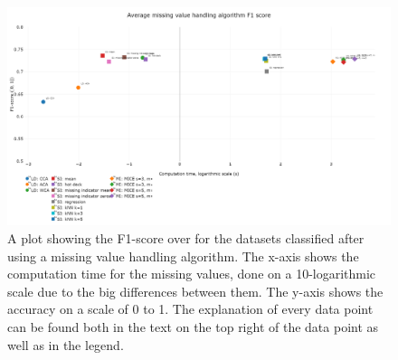 \documentclass[10pt,a4paper]{report}
\begin{document}
	\begin{figure}[H]
		\centering
		\includegraphics[angle=90,height=0.9\textheight]{avg_F1.PNG}
		\caption{A plot showing the F1-score over for the datasets classified after using a missing value handling algorithm. The x-axis shows the computation time for the missing values, done on a 10-logarithmic scale due to the big differences between them. The y-axis shows the accuracy on a scale of 0 to 1. The explanation of every data point can be found both in the text on the top right of the data point as well as in the legend.}
		\label{fig:EvalAvgF1}
	\end{figure}
	
\end{document}
